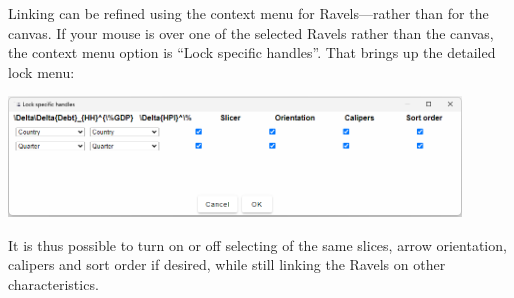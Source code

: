 Linking can be refined using the context menu for Ravels---rather
than for the canvas. If your mouse is over one of the selected Ravels
rather than the canvas, the context menu option is ``Lock specific
handles''. That brings up the detailed lock menu:

\includegraphics[width=12cm]{images/RavelLockSpecificHandles}

It is thus possible to turn on or off selecting of the same slices,
arrow orientation, calipers and sort order if desired, while still
linking the Ravels on other characteristics.
